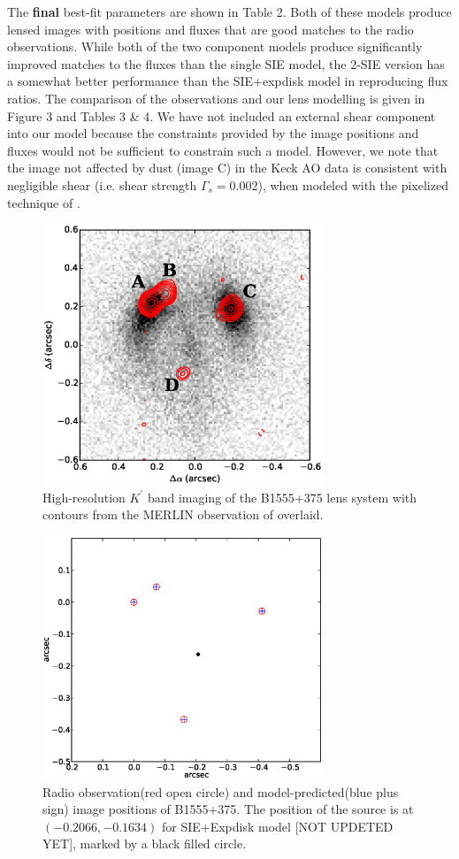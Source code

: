 \documentclass[useAMS,usenatbib]{mn2e}
\begin{document}
The \textbf{final} best-fit parameters are shown in Table
2. Both of these models produce lensed images with positions and
fluxes that are good matches to the radio observations.  While both of
the two component models produce significantly improved matches to the
fluxes than the single SIE model, the 2-SIE version has a somewhat
better performance than the SIE+expdisk model in reproducing flux
ratios. The comparison of the observations and our lens modelling is
given in Figure 3 and Tables 3 \& 4.  We have not included an external
shear component into our model because the constraints provided by the
image positions and fluxes would not be sufficient to constrain such a
model. However, we note that the image not affected by dust (image C)
in the Keck AO data is consistent with negligible shear (i.e. shear
strength $\Gamma_s=0.002$), when modeled with the pixelized technique
of \citet{V09}.

\begin{figure}
\includegraphics[width=84mm]{1555_ao_merlin_overlay.eps}
\caption{High-resolution  $K^\prime$ band imaging of the B1555+375 lens system 
with contours from the MERLIN observation of \citet{Marlow99} overlaid. 
%
\label{fig:merlin}}
\end{figure}


\begin{figure}
\includegraphics[width=84mm]{point_source.eps}
\caption{Radio observation(red open circle) and model-predicted(blue plus sign) image positions of B1555+375. The position of the source is at $(-0.2066,-0.1634)$ for SIE+Expdisk model [NOT UPDETED YET], marked by a black filled circle. \label{fig2}}
\end{figure}
\end{document}
